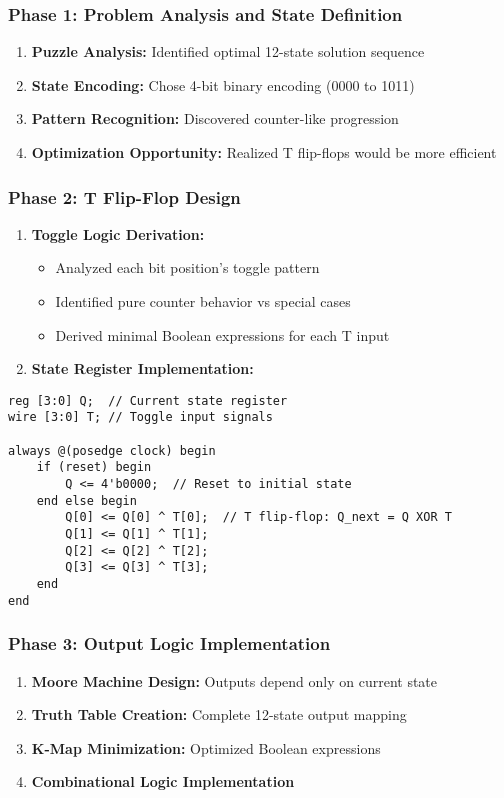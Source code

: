 \documentclass[12pt,letterpaper]{article}
\begin{document}
\subsubsection{Phase 1: Problem Analysis and State Definition}
\begin{enumerate}
    \item \textbf{Puzzle Analysis:} Identified optimal 12-state solution sequence
    \item \textbf{State Encoding:} Chose 4-bit binary encoding (0000 to 1011)
    \item \textbf{Pattern Recognition:} Discovered counter-like progression
    \item \textbf{Optimization Opportunity:} Realized T flip-flops would be more efficient
\end{enumerate}

\subsubsection{Phase 2: T Flip-Flop Design}
\begin{enumerate}
    \item \textbf{Toggle Logic Derivation:}
    \begin{itemize}
        \item Analyzed each bit position's toggle pattern
        \item Identified pure counter behavior vs special cases
        \item Derived minimal Boolean expressions for each T input
    \end{itemize}
    \item \textbf{State Register Implementation:}
\end{enumerate}

\begin{lstlisting}[caption={T Flip-Flop State Register Implementation}]
reg [3:0] Q;  // Current state register
wire [3:0] T; // Toggle input signals

always @(posedge clock) begin
    if (reset) begin
        Q <= 4'b0000;  // Reset to initial state
    end else begin
        Q[0] <= Q[0] ^ T[0];  // T flip-flop: Q_next = Q XOR T
        Q[1] <= Q[1] ^ T[1];
        Q[2] <= Q[2] ^ T[2]; 
        Q[3] <= Q[3] ^ T[3];
    end
end
\end{lstlisting}

\subsubsection{Phase 3: Output Logic Implementation}
\begin{enumerate}
    \item \textbf{Moore Machine Design:} Outputs depend only on current state
    \item \textbf{Truth Table Creation:} Complete 12-state output mapping
    \item \textbf{K-Map Minimization:} Optimized Boolean expressions
    \item \textbf{Combinational Logic Implementation}
\end{enumerate}
\end{document}
